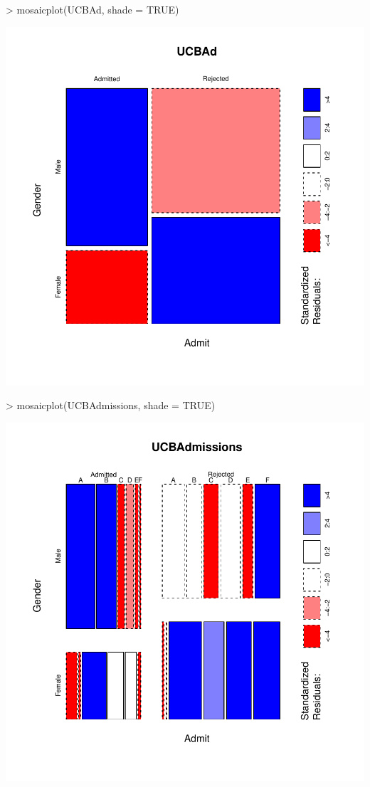\documentclass[12pt,letterpaper,final]{article}
\begin{document}
\begin{Schunk}
\begin{Sinput}
> mosaicplot(UCBAd, shade = TRUE)
\end{Sinput}
\end{Schunk}
\includegraphics{lect_main-041}

\begin{Schunk}
\begin{Sinput}
> mosaicplot(UCBAdmissions, shade = TRUE)
\end{Sinput}
\end{Schunk}
\includegraphics{lect_main-042}
\end{document}
